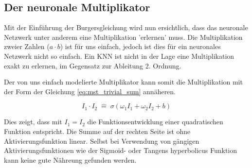 \subsection{Der neuronale Multiplikator}
Mit der Einführung der Burgersgleichung wird nun ersichtlich, dass das neuronale Netzwerk unter anderem eine Multiplikation 'erlernen' muss. Die Multiplikation zweier Zahlen ($a \cdot b$) ist für uns einfach, jedoch ist dies für ein neuronales Netzwerk nicht so einfach. Ein KNN ist nicht in der Lage eine Multiplikation exakt zu erlernen, im Gegensatz zur Ableitung 2. Ordnung. 
\begin{center}
\end{center}

Der von uns einfach modelierte Multiplikator kann somit die Multiplikation mit der Form der Gleichung \eqref{eq:mst_trivial_sum} annäheren. 

\begin{equation}
I_{1} \cdot I_{2} \; \hat{=} \; \sigma \left( \omega_{1} I_1 + \omega_{2} I_2 + b \right) 
\label{eq:mst_traivial_sum}
\end{equation}

Dies zeigt, dass mit $I_1 = I_2$ die Funktionsentwicklung einer quadratischen Funktion entspricht. Die Summe auf der rechten Seite ist ohne Aktivierungsfunktion linear. Selbst bei Verwendung von gängigen Aktivierungsfunktionen wie der Sigmoid- oder Tangens hyperbolicus Funktion kann keine gute Nähreung gefunden werden. 

